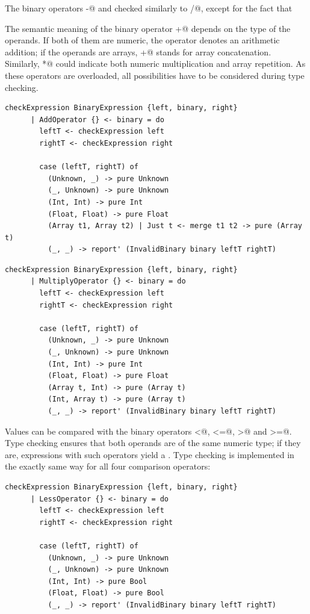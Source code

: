 \documentclass[UdineBachThesis,american,11pt,draft]{PhdThesis}
\begin{document}
  The binary operators \lstinline@-@ and \lstinline@%@ are type
  checked similarly to \lstinline@/@, except for the fact that
  \lstinline@%@ only accepts operands of type \lstinline@Int@.

  The semantic meaning of the binary operator \lstinline@+@ depends on the type
  of the operands. If both of them are numeric, the operator denotes an
  arithmetic addition; if the operands are arrays, \lstinline@+@ stands for
  array concatenation. Similarly, \lstinline@*@ could indicate both numeric
  multiplication and array repetition. As these operators are overloaded, all
  possibilities have to be considered during type checking.

  \begin{lstlisting}[gobble=4,basicstyle=\ttfamily\small]
    checkExpression BinaryExpression {left, binary, right}
      | AddOperator {} <- binary = do
        leftT <- checkExpression left
        rightT <- checkExpression right

        case (leftT, rightT) of
          (Unknown, _) -> pure Unknown
          (_, Unknown) -> pure Unknown
          (Int, Int) -> pure Int
          (Float, Float) -> pure Float
          (Array t1, Array t2) | Just t <- merge t1 t2 -> pure (Array t)
          (_, _) -> report' (InvalidBinary binary leftT rightT)
  \end{lstlisting}

  \begin{lstlisting}[gobble=4,basicstyle=\ttfamily\small]
    checkExpression BinaryExpression {left, binary, right}
      | MultiplyOperator {} <- binary = do
        leftT <- checkExpression left
        rightT <- checkExpression right

        case (leftT, rightT) of
          (Unknown, _) -> pure Unknown
          (_, Unknown) -> pure Unknown
          (Int, Int) -> pure Int
          (Float, Float) -> pure Float
          (Array t, Int) -> pure (Array t)
          (Int, Array t) -> pure (Array t)
          (_, _) -> report' (InvalidBinary binary leftT rightT)
  \end{lstlisting}

  Values can be compared with the binary operators \lstinline@<@,
  \lstinline@<=@, \lstinline@>@ and \lstinline@>=@. Type checking ensures that
  both operands are of the same numeric type; if they are, expressions with such
  operators yield a \lstinline@Bool@. Type checking is implemented in the
  exactly same way for all four comparison operators:

  \begin{lstlisting}[gobble=4,basicstyle=\ttfamily\small]
    checkExpression BinaryExpression {left, binary, right}
      | LessOperator {} <- binary = do
        leftT <- checkExpression left
        rightT <- checkExpression right

        case (leftT, rightT) of
          (Unknown, _) -> pure Unknown
          (_, Unknown) -> pure Unknown
          (Int, Int) -> pure Bool
          (Float, Float) -> pure Bool
          (_, _) -> report' (InvalidBinary binary leftT rightT)
  \end{lstlisting}
\end{document}
